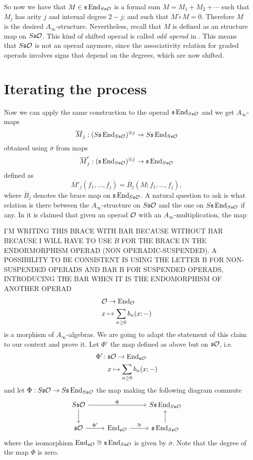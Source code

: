 \documentclass[twoside]{article}
\begin{document}
So now we have that $M\in\mathfrak{s}\operatorname{End}_{S\mathfrak{s}{\mathcal O}}$ is a formal sum $M=M_1+M_2+\cdots$ such that $M_j$ has arity $j$ and internal degree $2-j$; and such that $M\tilde\circ M=0$. Therefore $M$ is the desired $A_\infty$-structure. Nevertheless, recall that $M$ is defined as an structure map on $S\mathfrak{s}{\mathcal O}$. This kind of shifted operad is called \emph{odd operad} in \cite{ward}. This means that $S\mathfrak{s}{\mathcal O}$ is not an operad anymore, since the associativity relation for graded operads involves signs that depend on the degrees, which are now shifted.

\section{Iterating the process}

Now we can apply the same construction to the operad $\mathfrak{s}\operatorname{End}_{S\mathfrak{s}{\mathcal O}}$ and we get $A_\infty$-maps 
\[\overline{M}_j:(S\mathfrak{s}\operatorname{End}_{S\mathfrak{s}{\mathcal O}})^{\otimes j}\to S\mathfrak{s}\operatorname{End}_{S\mathfrak{s}{\mathcal O}}\]
obtained using $\overline{\sigma}$ from maps
\[\overline{M}'_j:(\mathfrak{s}\operatorname{End}_{S\mathfrak{s}{\mathcal O}})^{\otimes j}\to \mathfrak{s}\operatorname{End}_{S\mathfrak{s}{\mathcal O}}\]
defined as
\[\overline{M}'_j(f_1,\dots,f_j)=\overline{B}_j(M;f_1,\dots, f_j),\]
where $\overline{B}_j$ denotes the brace map on $\mathfrak{s}\operatorname{End}_{S\mathfrak{s}{\mathcal O}}$. A natural question to ask is what relation is there between the $A_\infty$-structure on $S\mathfrak{s}{\mathcal O}$ and the one on $S\mathfrak{s}\operatorname{End}_{S\mathfrak{s}{\mathcal O}}$ if any. In \cite{GV} it is claimed that given an operad ${\mathcal O}$ with an $A_\infty$-multiplication, the map

I'M WRITING THIS BRACE WITH BAR BECAUSE WITHOUT BAR BECAUSE I WILL HAVE TO USE $B$ FOR THE BRACE IN THE ENDORMORPHISM OPERAD (NON OPERADIC-SUSPENDED). A POSSIBILITY TO BE CONSISTENT IS USING THE LETTER B FOR NON-SUSPENDED OPERADS AND BAR B FOR SUSPENDED OPERADS, INTRODUCING THE BAR WHEN IT IS THE ENDOMORPHISM OF ANOTHER OPERAD
\begin{align*}
&{\mathcal O} \to \operatorname{End}_{\mathcal O}\\
&x\mapsto \sum_{n\geq 0}b_n(x;-)
\end{align*}
is a morphism of $A_\infty$-algebras. We are going to adapt the statement of this claim to our context and prove it. Let $\Phi'$ the map defined as above but on $\mathfrak{s}{\mathcal O}$, i.e.
\begin{align*}
\Phi'\colon&\mathfrak{s}{\mathcal O} \to \operatorname{End}_{\mathfrak{s}{\mathcal O}}\\
&x\mapsto \sum_{n\geq 0}b_n(x;-)
\end{align*}
and let $\Phi:S\mathfrak{s}{\mathcal O}\to S\mathfrak{s}\operatorname{End}_{S\mathfrak{s}{\mathcal O}}$ the map making the following diagram commute
\[
\begin{tikzcd}
S\s\OO\arrow[rr, "\Phi"]\arrow[d] & & S\s\End_{S\s\OO}\\
\s\OO\arrow[r, "\Phi'"]& \End_{\s\OO}\arrow[r, "\cong"]& \s\End_{S\s\OO}\arrow[u]
\end{tikzcd}
\]
where the isomorphism $\operatorname{End}_{\mathfrak{s}{\mathcal O}}\cong\mathfrak{s}\operatorname{End}_{S\mathfrak{s}{\mathcal O}}$ is given by $\overline{\sigma}$. Note that the degree of the map $\Phi$ is zero.
\end{document}
